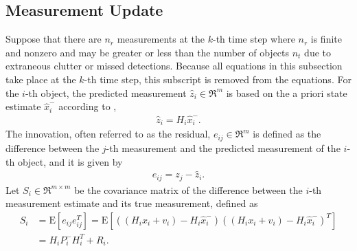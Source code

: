 \subsection{Measurement Update}

Suppose that there are $n_r$ measurements at the $k$-th time step where $n_r$ is finite and nonzero and may be greater or less than the number of objects $n_t$ due to extraneous clutter or missed detections.
Because all equations in this subsection take place at the $k$-th time step, this subscript is removed from the equations.
For the $i$-th object, the predicted measurement $\hat z_i\in\Re^m$ is based on the a priori state estimate $\hat x_{i}^-$ according to ,
\begin{align}
\label{eqn:zlin}
\hat z_i = H_i\hat x_{i}^-.
\end{align}
The innovation, often referred to as the residual, $e_{ij}\in\Re^m$ is defined as the difference between the $j$-th measurement and the predicted measurement of the $i$-th object, and it is given by
\begin{align}
e_{ij} = z_j - \hat z_i.\label{eqn:eij}
\end{align}
Let $S_i\in\Re^{m\times m}$ be the covariance matrix of the difference between the $i$-th measurement estimate and its true measurement, defined as
\begin{align}
S_{i}&=\mathrm{E}[e_{ij} e_{ij}^T]=\mathrm{E}[\left((H_ix_i+v_i)-H_i\hat x_{i}^-\right)\left((H_ix_i+v_i)-H_i\hat x_{i}^-\right)^T]\nonumber\\
&=H_{i}P_{i}^{-}H_{i}^T+R_{i}.\label{eqn:S}
\end{align}

